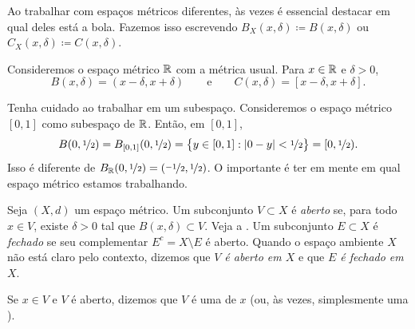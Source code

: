 Ao trabalhar com espaços métricos diferentes, às vezes é essencial destacar
em qual deles está a bola. Fazemos isso escrevendo
$B_X(x,\delta) \coloneqq B(x,\delta)$ ou
$C_X(x,\delta) \coloneqq C(x,\delta)$.

\begin{example}
Consideremos o espaço métrico ${\mathbb{R}}$ com a métrica usual. Para
$x \in {\mathbb{R}}$ e $\delta > 0$,
\begin{equation*}
B(x,\delta) = (x-\delta,x+\delta) \qquad \text{e} \qquad
C(x,\delta) = [x-\delta,x+\delta] .
\end{equation*}
\end{example}

\begin{example}
Tenha cuidado ao trabalhar em um subespaço. Consideremos o espaço métrico
$[0,1]$ como subespaço de ${\mathbb{R}}$. Então, em $[0,1]$,
\begin{equation*}
B(0,\nicefrac{1}{2}) = B_{[0,1]}(0,\nicefrac{1}{2})
= \bigl\{ y \in [0,1] : \lvert {0-y} \rvert < \nicefrac{1}{2} \bigr\}
= [0,\nicefrac{1}{2}) .
\end{equation*}
Isso é diferente de $B_{{\mathbb{R}}}(0,\nicefrac{1}{2}) =
(\nicefrac{-1}{2},\nicefrac{1}{2})$.
O importante é ter em mente em qual espaço métrico estamos trabalhando.
\end{example}

\begin{defn}
Seja $(X,d)$ um espaço métrico. Um subconjunto $V \subset X$ é
\emph{aberto} se, para todo $x \in V$, existe
$\delta > 0$ tal que $B(x,\delta) \subset V$. Veja a
. Um subconjunto $E \subset X$ é
\emph{fechado} se seu complementar
$E^c = X \setminus E$ é aberto.
Quando o espaço ambiente $X$ não está claro pelo contexto,
dizemos que \emph{$V$ é aberto em $X$} e que \emph{$E$ é fechado em $X$}.

Se $x \in V$ e $V$ é aberto, dizemos que $V$ é uma
\emph{} de $x$ (ou, às vezes, simplesmente uma
\emph{}).
\end{defn}

\begin{myfigureht}
\caption{Conjunto aberto em um espaço métrico. Note que $\delta$ depende de $x$.\label{fig:msopenset}}
\end{myfigureht}

